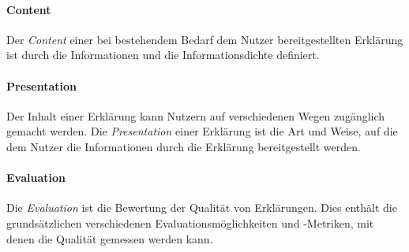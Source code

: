 \paragraph{Content} Der \textit{Content} einer bei bestehendem Bedarf dem Nutzer bereitgestellten Erklärung ist durch die Informationen und die Informationsdichte definiert.

\paragraph{Presentation} Der Inhalt einer Erklärung kann Nutzern auf verschiedenen Wegen zugänglich gemacht werden. Die \textit{Presentation} einer Erklärung ist die Art und Weise, auf die dem Nutzer die Informationen durch die Erklärung bereitgestellt werden.

\paragraph{Evaluation} Die \textit{Evaluation} ist die Bewertung der Qualität von Erklärungen. Dies enthält die grundsätzlichen verschiedenen Evaluationsmöglichkeiten und -Metriken, mit denen die Qualität gemessen werden kann.



\newpage





